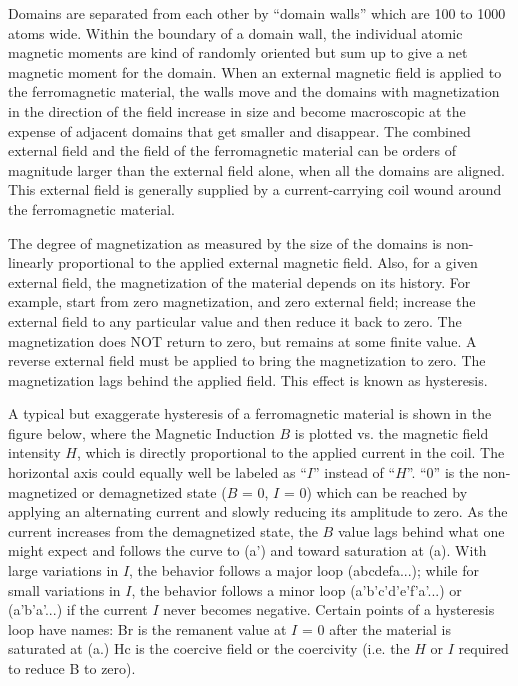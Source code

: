 \documentclass{../lab}
\begin{document}
Domains are separated from each other by ``domain walls'' which are 100 to 1000 atoms wide. Within the boundary of a domain wall, the individual atomic magnetic moments are kind of randomly oriented but sum up to give a net magnetic moment for the domain. When an external magnetic field is applied to the ferromagnetic material, the walls move and the domains with magnetization in the direction of the field increase in size and become macroscopic at the expense of adjacent domains that get smaller and disappear. The combined external field and the field of the ferromagnetic material can be orders of magnitude larger than the external field alone, when all the domains are aligned. This external field is generally supplied by a current-carrying coil wound around the ferromagnetic material.

The degree of magnetization as measured by the size of the domains is non-linearly proportional to the applied external magnetic field. Also, for a given external field, the magnetization of the material depends on its history. For example, start from zero magnetization, and zero external field; increase the external field to any particular value and then reduce it back to zero. The magnetization does NOT return to zero, but remains at some finite value. A reverse external field must be applied to bring the magnetization to zero. The magnetization lags behind the applied field. This effect is known as hysteresis.

A typical but exaggerate hysteresis of a ferromagnetic material is shown in the figure below, where the Magnetic Induction $B$ is plotted vs. the magnetic field intensity $H$, which is directly proportional to the applied current in the coil. The horizontal axis could equally well be labeled as ``$I$'' instead of ``$H$''. ``0'' is the non-magnetized or demagnetized state ($B$ = 0, $I$ = 0) which can be reached by applying an alternating current and slowly reducing its amplitude to zero. As the current increases from the demagnetized state, the $B$ value lags behind what one might expect and follows the curve to (a') and toward saturation at (a). With large variations in $I$, the behavior follows a major loop (abcdefa...); while for small variations in $I$, the behavior follows a minor loop (a'b'c'd'e'f'a'...) or (a'b'a'...) if the current $I$ never becomes negative. Certain points of a hysteresis loop have names: Br is the remanent value at $I$ = 0 after the material is saturated at (a.) Hc is the coercive field or the coercivity (i.e. the $H$ or $I$ required to reduce B to zero).
\end{document}
